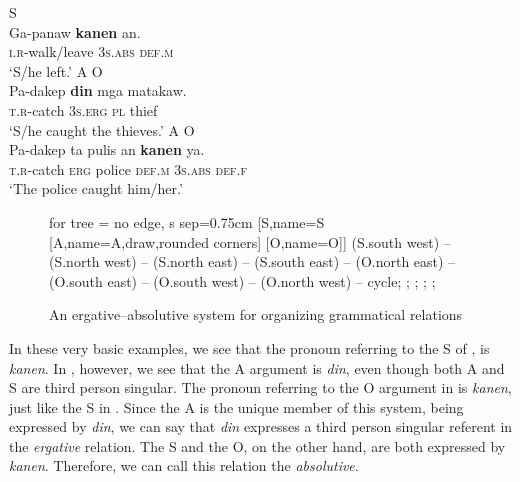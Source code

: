 \ea 
\label{bkm:Ref482781620}
	\ea 
        \label{ex:gapanawkanenan}
        \label{ex:sheleft}
	\hspace{2.6cm}  S \\
	\gll Ga-panaw \textbf{kanen} an. \\
        \textsc{i.r}-walk/leave 3\textsc{s.abs} \textsc{def.m} \\
	\glt ‘S/he left.’
	\ex 
        \label{ex:shecaughtthethief}
	\hspace{1.8cm}A \hspace{1cm} O \\\smallskip
\gll Pa-dakep \textbf{din} mga matakaw. \\
        \textsc{t.r}-catch 3\textsc{s.erg} \textsc{pl} thief \\
	\glt ‘S/he caught the thieves.’
	\ex 
        \label{ex:thepolicecaughther}
	\hspace{2cm}A \hspace{2.3cm}O \\
	\gll Pa-dakep ta pulis an \textbf{kanen} ya. \\
        \textsc{t.r}-catch \textsc{erg} police \textsc{def.m} 3\textsc{s.abs} \textsc{def.f} \\
	\glt ‘The police caught him/her.’
	\z
\z
\begin{figure}
	\caption{An ergative--absolutive system for organizing grammatical relations}
	\begin{forest} for tree = {no edge, s sep=0.75cm}
		[S,name=S [A,name=A,draw,rounded corners] [O,name=O]]
		  (S.south west) -- (S.north west) -- (S.north east) -- (S.south east) -- (O.north east) -- (O.south east) -- (O.south west) -- (O.north west) -- cycle;
		;
		;
		;
		;
	\end{forest}
\end{figure}
In these very basic examples, we see that the pronoun referring to the S of , is \textit{kanen}. In , however, we see that the A argument is \textit{din}, even though both A and S are third person singular. The pronoun referring to the O argument in  is \textit{kanen}, just like the S in . Since the A is the unique member of this system, being expressed by \textit{din}, we can say that \textit{din} expresses a third person singular referent in the \textit{ergative} relation. The S and the O, on the other hand, are both expressed by \textit{kanen}. Therefore, we can call this relation the \textit{absolutive}.

